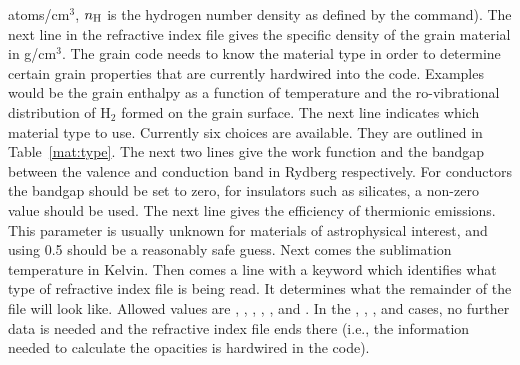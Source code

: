 atoms/cm$^3$, $n_{\rm H}$ is the hydrogen number density as defined by the
 command). The next line in the refractive index file gives
the specific density of the grain material in g/cm$^3$. The grain code needs
to know the material type in order to determine certain grain properties that
are currently hardwired into the code. Examples would be the grain enthalpy as
a function of temperature and the ro-vibrational distribution of H$_2$ formed
on the grain surface. The next line indicates which material type to use.
Currently six choices are available. They are outlined in
Table~\ref{mat:type}. The next two lines give the work function and the
bandgap between the valence and conduction band in Rydberg respectively. For
conductors the bandgap should be set to zero, for insulators such as
silicates, a non-zero value should be used. The next line gives the efficiency
of thermionic emissions. This parameter is usually unknown for materials of
astrophysical interest, and using 0.5 should be a reasonably safe guess. Next
comes the sublimation temperature in Kelvin. Then comes a line with a keyword
which identifies what type of refractive index file is being read. It
determines what the remainder of the file will look like. Allowed values are
, , ,
, , and . In the
, , , and 
cases, no further data is needed and the refractive index file ends there
(i.e., the information needed to calculate the opacities is hardwired in the
code).

